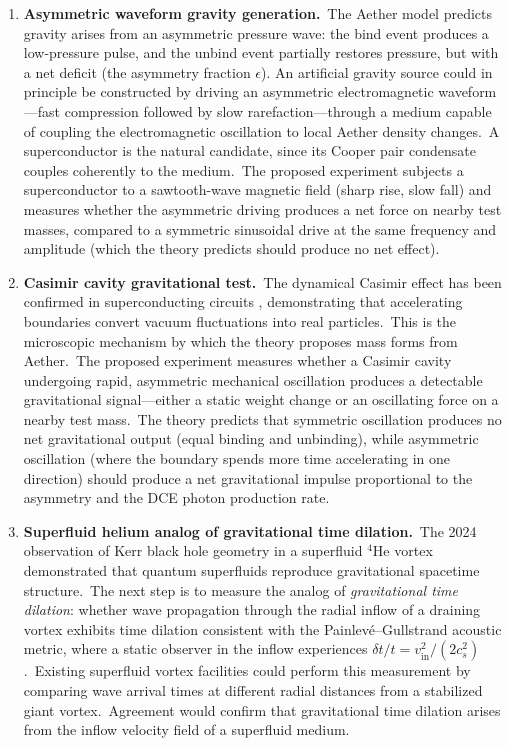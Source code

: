 ﻿\documentclass[12pt,letterpaper]{article}
\newcommand{\vin}{v_{\mathrm{in}}}
\begin{document}
\begin{enumerate}[leftmargin=2em]
  \item \textbf{Asymmetric waveform gravity generation.}\
    The Aether model predicts gravity arises from an asymmetric pressure wave:
    the bind event produces a low-pressure pulse, and the unbind event partially
    restores pressure, but with a net deficit (the asymmetry fraction $\epsilon$).
    An artificial gravity source could in principle be constructed by driving
    an asymmetric electromagnetic waveform---fast compression followed by
    slow rarefaction---through a medium capable of coupling the electromagnetic
    oscillation to local Aether density changes.\ A superconductor is the natural
    candidate, since its Cooper pair condensate couples coherently to the medium.\
    The proposed experiment subjects a superconductor to a sawtooth-wave magnetic
    field (sharp rise, slow fall) and measures whether the asymmetric driving
    produces a net force on nearby test masses, compared to a symmetric sinusoidal
    drive at the same frequency and amplitude (which the theory predicts should
    produce no net effect).

  \item \textbf{Casimir cavity gravitational test.}\
    The dynamical Casimir effect has been confirmed in superconducting circuits
    \cite{wilson2011}, demonstrating that accelerating boundaries convert vacuum
    fluctuations into real particles.\ This is the microscopic mechanism by which
    the theory proposes mass forms from Aether.\ The proposed experiment measures
    whether a Casimir cavity undergoing rapid, asymmetric mechanical oscillation
    produces a detectable gravitational signal---either a static weight change
    or an oscillating force on a nearby test mass.\ The theory predicts that
    symmetric oscillation produces no net gravitational output (equal binding
    and unbinding), while asymmetric oscillation (where the boundary spends more
    time accelerating in one direction) should produce a net gravitational impulse
    proportional to the asymmetry and the DCE photon production rate.

  \item \textbf{Superfluid helium analog of gravitational time dilation.}\
    The 2024 observation of Kerr black hole geometry in a superfluid ${}^4$He
    vortex \cite{svancara2024} demonstrated that quantum superfluids reproduce
    gravitational spacetime structure.\ The next step is to measure the analog of
    \emph{gravitational time dilation}: whether wave propagation through the
    radial inflow of a draining vortex exhibits time dilation consistent with the
    Painlev\'{e}--Gullstrand acoustic metric, where a static observer in the
    inflow experiences $\delta t/t = \vin^2/(2c_s^2)$.\ Existing superfluid
    vortex facilities could perform this measurement by comparing wave arrival
    times at different radial distances from a stabilized giant vortex.\
    Agreement would confirm that gravitational time dilation arises from the
    inflow velocity field of a superfluid medium.


\end{enumerate}
\end{document}
